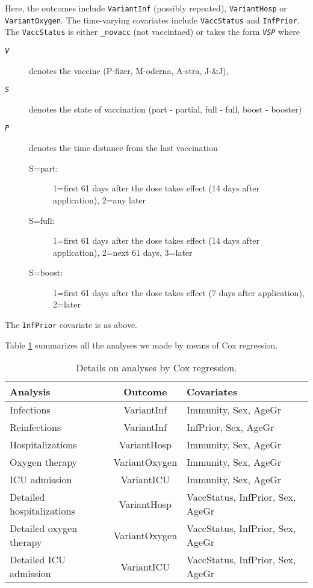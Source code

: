 \documentclass[9pt,onecolumn,twoside,lineno]{article}
\begin{document}
Here, the outcomes include {\tt VariantInf} (possibly repeated),  {\tt VariantHosp} or {\tt VariantOxygen}. The time-varying covariates include  {\tt VaccStatus} and {\tt InfPrior}.
The {\tt VaccStatus} is either {\tt \_novacc} (not vaccintaed) or takes the form {\tt \em VSP} where
\begin{description}
\item[{\tt \em V}] denotes the vaccine (P-fizer, M-oderna, A-stra, J-\&J),
\item[{\tt \em S}] denotes the state of vaccination (part - partial, full - full, boost - booster)
\item[{\tt \em P}] denotes the time distance from the last vaccination
\begin{description}
\item[S=part:] 1=first 61 days after the dose takes effect (14 days after application), 2=any later
\item[S=full:] 1=first 61 days after the dose takes effect (14 days after application), 2=next 61 days, 3=later
\item[S=boost:] 1=first 61 days after the dose takes effect (7 days after application), 2=later 
\end{description}
\end{description}

The {\tt InfPrior} covariate is as above.

\bigskip

Table \ref{tab:anals} summarizes all the analyses we made by means of Cox regression. 

\begin{table}
\caption{Details on analyses by Cox regression. \vspace{1mm}}
\centering
\begin{tabular}{lcl}
\hline
Analysis & Outcome & Covariates \\ \hline
Infections   & VariantInf & 
Immunity, Sex, AgeGr \\
Reinfections & VariantInf & InfPrior, Sex, AgeGr \\
Hospitalizations &  VariantHosp & Immunity, Sex, AgeGr \\
Oxygen therapy &  VariantOxygen & Immunity, Sex, AgeGr \\
ICU admission & VariantICU & Immunity, Sex, AgeGr \\
Detailed hospitalizations &  VariantHosp & VaccStatus, InfPrior, Sex, AgeGr \\
Detailed oxygen therapy &  VariantOxygen & VaccStatus, InfPrior, Sex, AgeGr \\
Detailed ICU admission & VariantICU & VaccStatus, InfPrior, Sex, AgeGr \\
\hline
\end{tabular}
\label{tab:anals}
\end{table}
\end{document}
